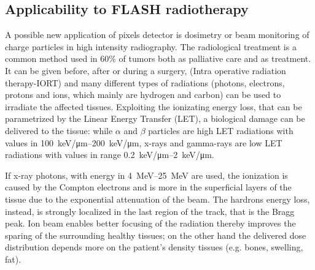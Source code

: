     \subsection{Applicability to FLASH radiotherapy}
        A possible new application of pixels detector is dosimetry or beam monitoring of charge particles in high intensity radiography.
        The radiological treatment is a common method used in 60\% of tumors both as palliative care and as treatment. It can be given before, after or during a surgery, (Intra operative radiation therapy-IORT) and many different types of radiations (photons, electrons, protons and ions, which mainly are hydrogen and carbon) can be used to irradiate the affected tissues.
        Exploiting the ionizating energy loss, that can be parametrized by the Linear Energy Transfer (LET), a biological damage can be delivered to the tissue: while $\alpha$ and $\beta$ particles are high LET radiations with values in \SIrange{100}{200}{keV/\um}, x-rays and gamma-rays are low LET radiations with values in range \SIrange{0.2}{2}{keV/\um}.

        If x-ray photons, with energy in \SIrange{4}{25}{MeV} are used, the ionization is caused by the Compton electrons and is more in the superficial layers of the tissue due to the exponential attenuation of the beam. 
        The hardrons energy loss, instead, is strongly localized in the last region of the track, that is the Bragg peak. 
        Ion beam enables better focusing of the radiation thereby improves the sparing of the surrounding healthy tissues; on the other hand the delivered dose distribution depends more on the patient's density tissues (e.g. bones, swelling, fat). 

